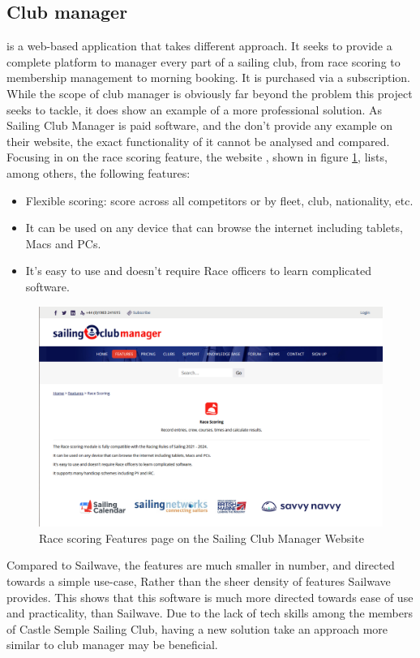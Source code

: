 \documentclass{l4proj}
\begin{document}
\subsection{Club manager}
\citet{ClubManager} is a web-based application that takes different approach. It seeks to provide a complete platform to manager every part of a sailing club, from race scoring to membership management to morning booking. It is purchased via a subscription. 
While the scope of club manager is obviously far beyond the problem this project seeks to tackle, it does show an example of a more professional solution. As Sailing Club Manager is paid software, and the don’t provide any example on their website, the exact functionality of it cannot be analysed and compared.
Focusing in on the race scoring feature, the website \citep{ClubManager}, shown in figure \ref{fig:ClubManager},  lists, among others, the following features:

\begin{itemize}
    \item
    Flexible scoring: score across all competitors or by fleet, club, nationality, etc.
    \item
    It can be used on any device that can browse the internet including tablets, Macs and PCs. 
    \item
    It's easy to use and doesn't require Race officers to learn complicated software. 
\end{itemize}

\begin{figure}[h!]
    \centering
    \includegraphics[width=0.6\linewidth]{images/ClubManager.png} 

    \caption{Race scoring Features page on the Sailing Club Manager Website \citep{ClubManager}
    }

    \label{fig:ClubManager}
\end{figure}
Compared to Sailwave, the features are much smaller in number, and directed towards a simple use-case, Rather than the sheer density of features Sailwave provides. This shows that this software is much more directed towards ease of use and practicality, than Sailwave. Due to the lack of tech skills among the members of Castle Semple Sailing Club, having a new solution take an approach more similar to club manager may be beneficial.
\end{document}
